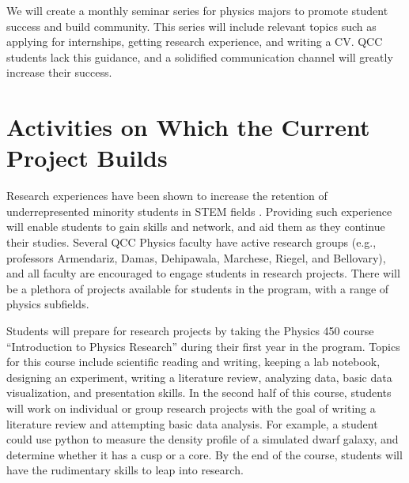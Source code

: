 \documentclass[12pt]{article}
\begin{document}
We will create a monthly seminar series for physics majors to promote student success and build community.  This series will include relevant topics such as applying for internships, getting research experience, and writing a CV.  QCC students lack this guidance, and a solidified communication channel will greatly increase their success.


\section{Activities on Which the Current Project Builds}


Research experiences have been shown to increase the retention of underrepresented minority students in STEM fields \citep{Graham,Russell}.  Providing such experience will enable students to gain skills and network, and aid them as they continue their studies.  Several QCC Physics faculty have active research groups (e.g., professors Armendariz, Damas, Dehipawala, Marchese, Riegel, and Bellovary), and all faculty are encouraged to engage students in research projects.  There will be a plethora of projects available for students in the program, with a range of physics subfields.  %

Students will prepare for research projects by taking the Physics 450 course ``Introduction to Physics Research'' during their first year in the program.   Topics for this course include scientific reading and writing, keeping a lab notebook, designing an experiment, writing a literature review, analyzing data, basic data visualization, and presentation skills.  In the second half of this course, students will work on individual or group research projects with the goal of writing a literature review and attempting basic data analysis.  For example, a student could use python to measure the density profile of a simulated dwarf galaxy, and determine whether it has a cusp or a core.  By the end of the course, students will have the rudimentary skills to leap into research.
\end{document}
